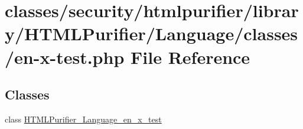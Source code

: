 \hypertarget{classes_2en-x-test_8php}{\section{classes/security/htmlpurifier/library/\+H\+T\+M\+L\+Purifier/\+Language/classes/en-\/x-\/test.php File Reference}
\label{classes_2en-x-test_8php}
}
\subsection*{Classes}
\begin{DoxyCompactItemize}
\item 
class \hyperlink{classHTMLPurifier__Language__en__x__test}{H\+T\+M\+L\+Purifier\+\_\+\+Language\+\_\+en\+\_\+x\+\_\+test}
\end{DoxyCompactItemize}
